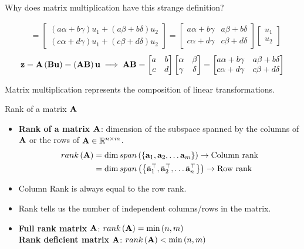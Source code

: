 \documentclass[aspectratio=169]{beamer}
\let\olditem\item
\renewcommand{\item}{\setlength{\itemsep}{\fill}\olditem}
\def\mf{\ensuremath\mathbf}
\def\mb{\ensuremath\mathbb}
\def\lp{\ensuremath\left(}
\def\rp{\ensuremath\right)}
\def\lc{\ensuremath\left\{}
\def\rc{\ensuremath\right\}}
\begin{document}
\begin{frame}[t]{Why does matrix multiplication have this strange definition?}
\begin{small}
\[\begin{split}
  &= \begin{bmatrix}\left(a\alpha + b\gamma\right) u_1 + \left(a\beta + b\delta\right)u_2 \\ \left(c\alpha + d\gamma\right)u_1  + \left(c\beta + d\delta\right)u_2 \end{bmatrix} = \begin{bmatrix}a\alpha + b\gamma & a\beta + b\delta \\ c\alpha + d\gamma & c\beta + d\delta \end{bmatrix} \begin{bmatrix}u_1 \\ u_2 \end{bmatrix}
  \end{split}
  \]
  \[\mf{z} = \mf{A}\lp\mf{B}\mf{u}\rp = \lp\mf{A}\mf{B}\rp\mf{u} \implies \mf{A}\mf{B} = \begin{bmatrix}a & b \\ c & d\end{bmatrix}\begin{bmatrix}\alpha & \beta \\ \gamma & \delta\end{bmatrix} = \begin{bmatrix}a\alpha + b\gamma & a\beta + b\delta \\ c\alpha + d\gamma & c\beta + d\delta \end{bmatrix}
  \]
  \end{small}
  Matrix multiplication represents the composition of linear transformations.
\end{frame}


\begin{frame}[t]{Rank of a matrix $\mf{A}$}
  \begin{itemize}
  \item \textbf{Rank of a matrix $\mf{A}$}: dimension of the subspace spanned by the columns of $\mf{A}$ or the rows of $\mf{A} \in \mb{R}^{n \times m}$. 
  \[ \begin{split} 
  rank\lp \mf{A} \rp &= \mathrm{dim} \, span\lp \lc \mf{a}_1, \mf{a}_2, \ldots \mf{a}_m \rc \rp \rightarrow \text{Column rank}\\ 
  &= \mathrm{dim} \, span\lp \lc \tilde{\mf{a}}_1^\top, \tilde{\mf{a}}_2^\top, \ldots \tilde{\mf{a}}_n^\top \rc \rp \rightarrow \text{Row rank}
  \end{split}
  \]
  
  \item Column Rank is always equal to the row rank.
  
  \item Rank tells us the number of independent columns/rows in the matrix.
  
  \item \textbf{Full rank matrix } $\mf{A}$: $rank\lp \mf{A} \rp  = \min\lp n, m\rp$\\
        \textbf{Rank deficient matrix } $\mf{A}$: $rank\lp \mf{A} \rp  < \min\lp n, m\rp$
  \end{itemize}
  \end{frame}
    
\end{document}
